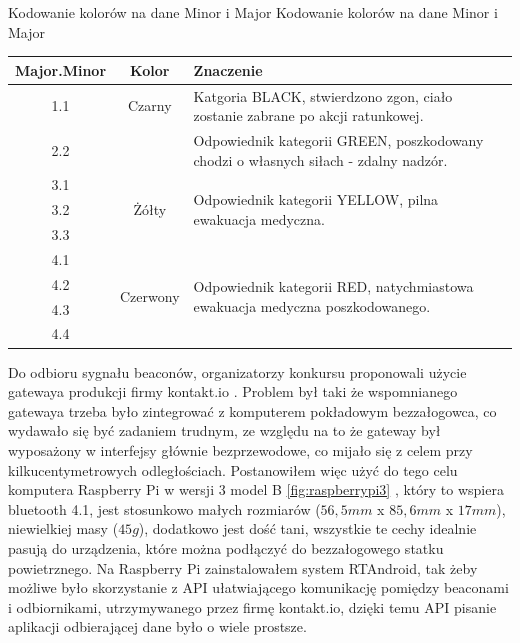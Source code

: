 \begin{tablica}
    {Kodowanie kolorów na dane Minor i Major}
    {Kodowanie kolorów na dane Minor i Major}
    {
    \begin{tabular}{|c|c|p{10cm}|} \hline
	    \textbf{Major.Minor} & \textbf{Kolor} & \textbf{Znaczenie} \\ \hline
	    \multirow{2}{*}{1.1} & \multirow{2}{1.65cm}{Czarny} & Katgoria BLACK, stwierdzono zgon, ciało zostanie zabrane po akcji ratunkowej. \\ \hline
	    2.1 & \multirow{2}{1.65cm}{Zielony} & \multirow{2}{10cm}{Odpowiednik kategorii GREEN, poszkodowany chodzi o własnych siłach - zdalny nadzór.} \\
	2.2 & &  \\ \hline
	    3.1 & \multirow{3}{1.65cm}{Żółty} & \multirow{3}{10cm}{Odpowiednik kategorii YELLOW, pilna ewakuacja medyczna.} \\
	3.2 & &  \\
	3.3 & &  \\ \hline
	    4.1 & \multirow{4}{1.65cm}{Czerwony} & \multirow{4}{10cm}{Odpowiednik kategorii RED, natychmiastowa ewakuacja medyczna poszkodowanego.} \\
	4.2 & &  \\
	4.3 & &  \\
	4.4 & &  \\ \hline
    \end{tabular}
    }
    \label{tab:minormajor}
\end{tablica}

Do odbioru sygnału beaconów, organizatorzy konkursu proponowali użycie gatewaya produkcji firmy kontakt.io \cite{gateway}. Problem był taki że wspomnianego gatewaya trzeba było zintegrować z komputerem pokładowym bezzałogowca, co wydawało się być zadaniem trudnym, ze względu na to że gateway był wyposażony w interfejsy głównie bezprzewodowe, co mijało się z celem przy kilkucentymetrowych odległościach. Postanowiłem więc użyć do tego celu komputera Raspberry Pi w wersji 3 model B \ref{fig:raspberrypi3} \cite{raspberrypimodelscomparison}, który to wspiera bluetooth 4.1, jest stosunkowo małych rozmiarów ($56,5 mm$ x $85,6 mm$ x $17 mm$), niewielkiej masy ($45g$), dodatkowo jest dość tani, wszystkie te cechy idealnie pasują do urządzenia, które można podłączyć do bezzałogowego statku powietrznego. Na Raspberry Pi zainstalowałem system RTAndroid\cite{rtandroid}, tak żeby możliwe było skorzystanie z API ułatwiającego komunikację pomiędzy beaconami i odbiornikami, utrzymywanego przez firmę kontakt.io, dzięki temu API pisanie aplikacji odbierającej dane było o wiele prostsze.

